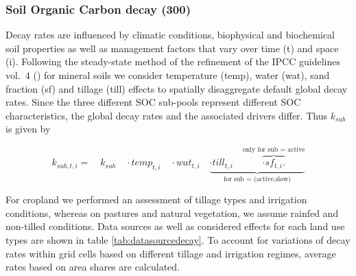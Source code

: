 \documentclass[gc, manuscript]{copernicus}
\begin{document}
\hypertarget{sec:tier2}{%
\subsubsection{Soil Organic Carbon decay (300)}\label{sec:tier2}}

Decay rates are influenced by climatic conditions, biophysical and biochemical soil properties as well as management factors that vary over time (t) and space (i). Following the steady-state method of the refinement of the IPCC guidelines vol.~4 (\citet{ipcc_2019_2019}) for mineral soils we consider temperature (temp), water (wat), sand fraction (sf) and tillage (till) effects to spatially disaggregate default global decay rates. Since the three different SOC sub-pools represent different SOC characteristics, the global decay rates and the associated drivers differ. Thus \(k_{sub}\) is given by

\begin{equation}
k_{sub,t,i} = \quad k_{sub} \quad \cdot temp_{t,i} \quad \cdot wat_{t,i} \quad \underbrace{\cdot till_{t,i} \quad \overbrace{\cdot sf_{t,i}.}^\text{only for sub = active}}_{\text{for sub = (active,slow)}}
\label{eq:decayrates}
\end{equation}

For cropland we performed an assessment of tillage types and irrigation conditions, whereas on pastures and natural vegetation, we assume rainfed and non-tilled conditions. Data sources as well as considered effects for each land use types are shown in table \ref{tab:datasourcedecay}. To account for variations of decay rates within grid cells based on different tillage and irrigation regimes, average rates based on area shares are calculated.
\end{document}
